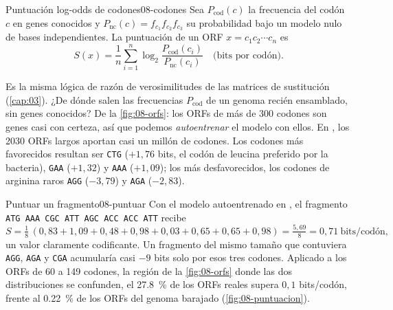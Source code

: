 \begin{definicion}{Puntuación log-odds de codones}{08-codones}
Sea $P_{\text{cod}}(c)$ la frecuencia del codón $c$ en genes conocidos y $P_{\text{nc}}(c)=f_{c_1}f_{c_2}f_{c_3}$ su probabilidad bajo un modelo nulo de bases independientes. La puntuación de un ORF $x=c_1c_2\cdots c_n$ es
\begin{equation}\label{eq:08-logodds}
S(x) = \frac{1}{n}\sum_{i=1}^{n}\log_2\frac{P_{\text{cod}}(c_i)}{P_{\text{nc}}(c_i)}\quad\text{(bits por codón)}.
\end{equation}
\end{definicion}

\begin{simbolos}
\end{simbolos}

Es la misma lógica de razón de verosimilitudes de las matrices de sustitución (\cref{cap:03}). ¿De dónde salen las frecuencias $P_{\text{cod}}$ de un genoma recién ensamblado, sin genes conocidos? De la \cref{fig:08-orfs}: los ORFs de más de 300 codones son genes casi con certeza, así que podemos \emph{autoentrenar} el modelo con ellos. En , los \num{2030} ORFs largos aportan casi un millón de codones. Los codones más favorecidos resultan ser \texttt{CTG} ($+1{,}76$ bits, el codón de leucina preferido por la bacteria), \texttt{GAA} ($+1{,}32$) y \texttt{AAA} ($+1{,}09$); los más desfavorecidos, los codones de arginina raros \texttt{AGG} ($-3{,}79$) y \texttt{AGA} ($-2{,}83$).

\begin{ejemplo}{Puntuar un fragmento}{08-puntuar}
Con el modelo autoentrenado en , el fragmento \texttt{ATG AAA CGC ATT AGC ACC ACC ATT} recibe
\[
S = \tfrac{1}{8}\,(0{,}83+1{,}09+0{,}48+0{,}98+0{,}03+0{,}65+0{,}65+0{,}98) = \tfrac{5{,}69}{8} = 0{,}71\ \text{bits/codón},
\]
un valor claramente codificante. Un fragmento del mismo tamaño que contuviera \texttt{AGG}, \texttt{AGA} y \texttt{CGA} acumularía casi $-9$ bits solo por esos tres codones. Aplicado a los ORFs de 60 a 149 codones, la región de la \cref{fig:08-orfs} donde las dos distribuciones se confunden, el \SI{27,8}{\percent} de los ORFs reales supera $0{,}1$ bits/codón, frente al \SI{0,22}{\percent} de los ORFs del genoma barajado (\cref{fig:08-puntuacion}).
\end{ejemplo}

